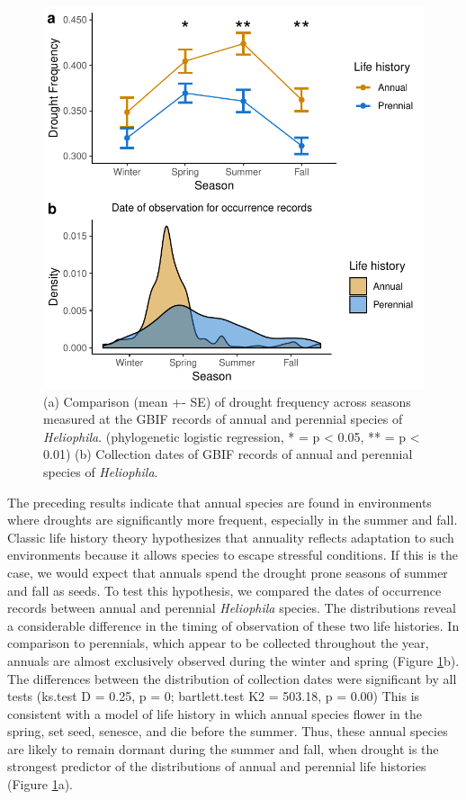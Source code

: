 \documentclass[man,floatsintext]{apa6}
\theoremstyle{definition}
\theoremstyle{definition}
\theoremstyle{definition}
\theoremstyle{remark}
\begin{document}
\begin{figure}[!h]
\includegraphics[width=\textwidth]{../figures/line_and_dates} \caption{(a) Comparison (mean +- SE) of drought frequency across
seasons measured at the GBIF records of annual and perennial species of
\emph{Heliophila}. (phylogenetic logistic regression, * = p \textless{}
0.05, ** = p \textless{} 0.01) (b) Collection dates of GBIF records of
annual and perennial species of \emph{Heliophila}.}\label{fig:lineplots}
\end{figure}

The preceding results indicate that annual species are found in
environments where droughts are significantly more frequent, especially
in the summer and fall. Classic life history theory hypothesizes that
annuality reflects adaptation to such environments because it allows
species to escape stressful conditions. If this is the case, we would
expect that annuals spend the drought prone seasons of summer and fall
as seeds. To test this hypothesis, we compared the dates of occurrence
records between annual and perennial \emph{Heliophila} species. The
distributions reveal a considerable difference in the timing of
observation of these two life histories. In comparison to perennials,
which appear to be collected throughout the year, annuals are almost
exclusively observed during the winter and spring (Figure
\ref{fig:lineplots}b). The differences between the distribution of
collection dates were significant by all tests (ks.test D = 0.25, p = 0;
bartlett.test K2 = 503.18, p = 0.00) This is consistent with a model of
life history in which annual species flower in the spring, set seed,
senesce, and die before the summer. Thus, these annual species are
likely to remain dormant during the summer and fall, when drought is the
strongest predictor of the distributions of annual and perennial life
histories (Figure \ref{fig:lineplots}a).
\end{document}
